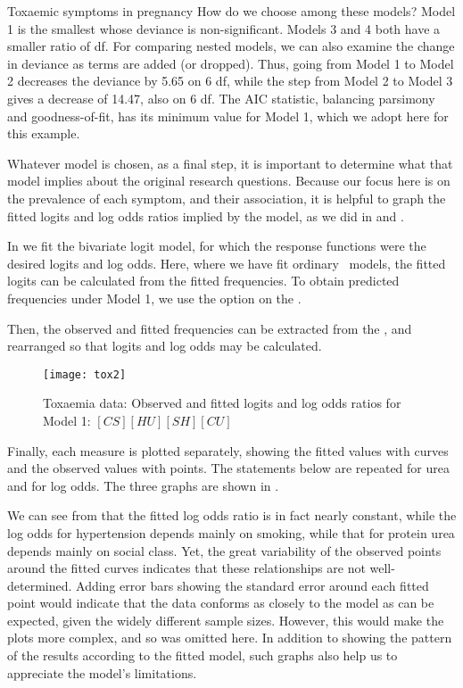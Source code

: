 \begin{Example}[toxaemia]{Toxaemic symptoms in pregnancy}
How do we choose among these models?  Model 1 is the smallest whose deviance
is non-significant. Models 3 and 4 both have a smaller ratio of \chisq\/df.
For comparing nested models, we can also examine the change in deviance as
terms are added (or dropped).  Thus, going from Model 1 to Model 2
decreases the deviance by 5.65 on 6 df, while the step from Model 2 to Model 3
gives a decrease of 14.47, also on 6 df.  The AIC statistic, balancing
parsimony and goodness-of-fit, has its minimum value for Model 1,
which we adopt here for this example.

Whatever model is chosen, as a final step, it is important to determine what
that model implies about the original research questions.
Because our focus here is on the prevalence of each symptom, and their
association, it is helpful to graph the fitted logits and log odds ratios
implied by the model, as we did in  and .

In  we fit the bivariate logit model, for which the
response functions were the desired logits and log odds.
Here, where we have fit ordinary \loglin\ models, the fitted logits
can be calculated from the fitted frequencies.
To obtain predicted frequencies under Model 1, we use the option
 on the .

Then, the observed and fitted frequencies can be extracted from
the \ODS, and rearranged so that logits and log odds
may be calculated.

\begin{figure}[htb]
  \centering
  \texttt{[image: tox2]}
  \caption{Toxaemia data: Observed and fitted logits and log odds ratios for Model 1: $[CS] [HU] [SH] [CU]$}%
  \label{fig:tox2}
\end{figure}
Finally, each measure is plotted separately, showing the fitted values
with curves and the observed values with points.  The statements
below are repeated for urea and for log odds.  The three graphs are
shown in .

We can see from  that the fitted log odds ratio is in fact
nearly constant,
while the log odds for hypertension depends mainly on smoking, while
that for protein urea depends mainly on social class.
Yet, the great variability of the observed points around the fitted
curves indicates that these relationships are not well-determined.
Adding error bars showing the standard error around each fitted point
would indicate that the data conforms as closely to the model as
can be expected, given the widely different sample sizes.
However, this would make the plots more complex, and so was omitted
here.
In addition to showing the pattern of the results according to the fitted
model, such graphs also help us to appreciate the model's limitations.
\end{Example}
